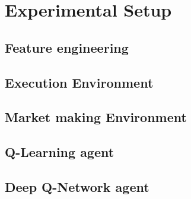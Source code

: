 \chapter{Experimental Setup}

\section{Feature engineering}

\section{Execution Environment}

\section{Market making Environment}

\section{Q-Learning agent}

\section{Deep Q-Network agent}
